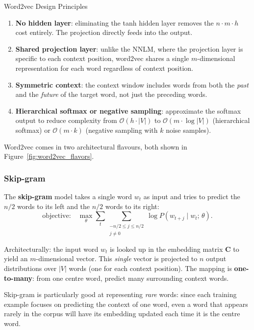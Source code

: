 \documentclass[11pt,a4paper]{article}
\newcommand{\term}[1]{\textcolor{DefGreen}{\textbf{#1}}}
\begin{document}
\begin{thmbox}{Word2vec Design Principles}
\begin{enumerate}
  \item \textbf{No hidden layer}: eliminating the tanh hidden layer removes the $n \cdot m \cdot h$ cost entirely. The projection directly feeds into the output.
  \item \textbf{Shared projection layer}: unlike the NNLM, where the projection layer is specific to each context position, word2vec shares a single $m$-dimensional representation for each word regardless of context position.
  \item \textbf{Symmetric context}: the context window includes words from both the \emph{past} and the \emph{future} of the target word, not just the preceding words.
  \item \textbf{Hierarchical softmax or negative sampling}: approximate the softmax output to reduce complexity from $\mathcal{O}(h \cdot |V|)$ to $\mathcal{O}(m \cdot \log|V|)$ (hierarchical softmax) or $\mathcal{O}(m \cdot k)$ (negative sampling with $k$ noise samples).
\end{enumerate}
\end{thmbox}

Word2vec comes in two architectural flavours, both shown in Figure~\ref{fig:word2vec_flavors}.

\subsubsection{Skip-gram}

The \term{skip-gram} model takes a single word $w_t$ as input and tries to predict the $n/2$ words to its left and the $n/2$ words to its right:
\[
  \text{objective:} \quad \max_\theta \sum_{t} \sum_{\substack{-n/2 \leq j \leq n/2 \\ j \neq 0}} \log P(w_{t+j} \mid w_t;\, \theta).
\]

Architecturally: the input word $w_t$ is looked up in the embedding matrix $\mathbf{C}$ to yield an $m$-dimensional vector. This \emph{single} vector is projected to $n$ output distributions over $|V|$ words (one for each context position). The mapping is \textbf{one-to-many}: from one centre word, predict many surrounding context words.

Skip-gram is particularly good at representing \emph{rare} words: since each training example focuses on predicting the context of one word, even a word that appears rarely in the corpus will have its embedding updated each time it is the centre word.
\end{document}
